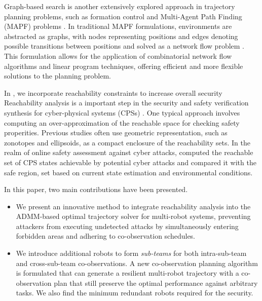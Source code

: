 \documentclass[10pt,twocolumn,twoside]{IEEEtran}
\begin{document}
Graph-based search is another extensively explored approach in trajectory planning problems, such as formation control \cite{tanner2004leader,hu2019distributed} and Multi-Agent Path Finding (MAPF) problems \cite{stern2019multi}. In traditional MAPF formulations, environments are abstracted as graphs, with nodes representing positions and edges denoting possible transitions between positions and solved as a network flow problem \cite{yu2013multi,yu2016optimal}. This formulation allows for the application of combinatorial network flow algorithms and linear program techniques, offering efficient and more flexible solutions to the planning problem. %

In , we incorporate reachability constraints to increase overall security Reachability analysis is a important step in the security and safety verification synthesis for cyber-physical systems (CPSs) \cite{gueguen2009safety,ding2020secure}. One typical approach involves computing an over-approximation of the reachable space for checking safety properities. Previous studies \cite{kurzhanski2000ellipsoidal,lakhal2019interval,maiga2015comprehensive} often use geometric representation, such as zonotopes and ellipsoids, as a compact enclosure of the reachability sets. In the realm of online safety assessment against cyber attacks, \cite{kwon2017reachability} computed the reachable set of CPS states achievable by potential cyber attacks and compared it with the safe region, set based on current state estimation and environmental conditions. 


\noindent{} 
In this paper, two main contributions have been presented. 

\begin{itemize}
  \item We present an innovative method to integrate reachability analysis into the ADMM-based optimal trajectory solver for multi-robot systems, preventing attackers from executing undetected attacks by simultaneously entering forbidden areas and adhering to co-observation schedules.
  \item We introduce additional robots to form \emph{sub-teams} for both intra-sub-team and cross-sub-team co-observations. A new co-observation planning algorithm is formulated that can generate a resilient multi-robot trajectory with a co-observation plan that still preserve the optimal performance against arbitrary tasks. We also find the minimum redundant robots required for the security.
\end{itemize}
\end{document}
